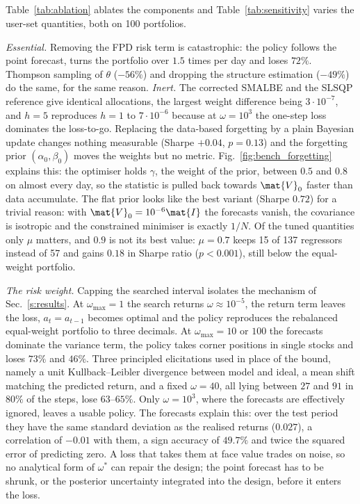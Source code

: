 \subsection{} \label{s:ablation_results}\label{s:sensitivity}
Table~\ref{tab:ablation} ablates the components and Table~\ref{tab:sensitivity} varies the user-set quantities, both on 100 portfolios.

\emph{Essential.} Removing the FPD risk term is catastrophic: the policy follows the point forecast, turns the portfolio over $1.5$ times per day and loses $72\%$. Thompson sampling of $\theta$ ($-56\%$) and dropping the structure estimation ($-49\%$) do the same, for the same reason. \emph{Inert.} The corrected SMALBE and the SLSQP reference give identical allocations, the largest weight difference being $3\cdot10^{-7}$, and $h=5$ reproduces $h=1$ to $7\cdot10^{-6}$ because at $\omega=10^3$ the one-step loss dominates the loss-to-go. Replacing the data-based forgetting by a plain Bayesian update changes nothing measurable (Sharpe $+0.04$, $p=0.13$) and the forgetting prior $(\alpha_0,\beta_0)$ moves the weights but no metric. Fig.~\ref{fig:bench_forgetting} explains this: the optimiser holds $\gamma$, the weight of the prior, between $0.5$ and $0.8$ on almost every day, so the statistic is pulled back towards $\mat{V}_0$ faster than data accumulate. The flat prior looks like the best variant (Sharpe $0.72$) for a trivial reason: with $\mat{V}_0=10^{-6}\mat{I}$ the forecasts vanish, the covariance is isotropic and the constrained minimiser is exactly $1/N$. Of the tuned quantities only $\mu$ matters, and $0.9$ is not its best value: $\mu=0.7$ keeps 15 of 137 regressors instead of 57 and gains $0.18$ in Sharpe ratio ($p<0.001$), still below the equal-weight portfolio.

\emph{The risk weight.} Capping the searched interval isolates the mechanism of Sec.~\ref{s:results}. At $\omega_{\max}=1$ the search returns $\omega\approx10^{-5}$, the return term leaves the loss, $a_t=a_{t-1}$ becomes optimal and the policy reproduces the rebalanced equal-weight portfolio to three decimals. At $\omega_{\max}=10$ or $100$ the forecasts dominate the variance term, the policy takes corner positions in single stocks and loses $73\%$ and $46\%$. Three principled elicitations used in place of the bound, namely a unit Kullback--Leibler divergence between model and ideal, a mean shift matching the predicted return, and a fixed $\omega=40$, all lying between $27$ and $91$ in $80\%$ of the steps, lose $63$--$65\%$. Only $\omega=10^3$, where the forecasts are effectively ignored, leaves a usable policy. The forecasts explain this: over the test period they have the same standard deviation as the realised returns ($0.027$), a correlation of $-0.01$ with them, a sign accuracy of $49.7\%$ and twice the squared error of predicting zero. A loss that takes them at face value trades on noise, so no analytical form of $\omega^{\ast}$ can repair the design; the point forecast has to be shrunk, or the posterior uncertainty integrated into the design, before it enters the loss.

